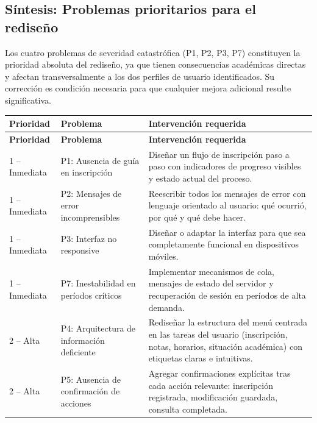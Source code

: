 \subsection{Síntesis: Problemas prioritarios para el rediseño}
Los cuatro problemas de severidad catastrófica (P1, P2, P3, P7) constituyen la prioridad absoluta del rediseño, ya que tienen consecuencias académicas directas y afectan transversalmente a los dos perfiles de usuario identificados. Su corrección es condición necesaria para que cualquier mejora adicional resulte significativa.

{\small
\setlength{\tabcolsep}{4pt}
\renewcommand{\arraystretch}{1.2}
\begin{longtable}{|p{2.3cm}|p{4.2cm}|p{7.3cm}|}
\hline
\textbf{Prioridad} & \textbf{Problema} & \textbf{Intervención requerida} \\
\hline
\endfirsthead

\hline
\textbf{Prioridad} & \textbf{Problema} & \textbf{Intervención requerida} \\
\hline
\endhead

1 -- Inmediata & P1: Ausencia de guía en inscripción & Diseñar un flujo de inscripción paso a paso con indicadores de progreso visibles y estado actual del proceso. \\
\hline

1 -- Inmediata & P2: Mensajes de error incomprensibles & Reescribir todos los mensajes de error con lenguaje orientado al usuario: qué ocurrió, por qué y qué debe hacer. \\
\hline

1 -- Inmediata & P3: Interfaz no responsive & Diseñar o adaptar la interfaz para que sea completamente funcional en dispositivos móviles. \\
\hline

1 -- Inmediata & P7: Inestabilidad en períodos críticos & Implementar mecanismos de cola, mensajes de estado del servidor y recuperación de sesión en períodos de alta demanda. \\
\hline

2 -- Alta & P4: Arquitectura de información deficiente & Rediseñar la estructura del menú centrada en las tareas del usuario (inscripción, notas, horarios, situación académica) con etiquetas claras e intuitivas. \\
\hline

2 -- Alta & P5: Ausencia de confirmación de acciones & Agregar confirmaciones explícitas tras cada acción relevante: inscripción registrada, modificación guardada, consulta completada. \\
\hline


\end{longtable}}
